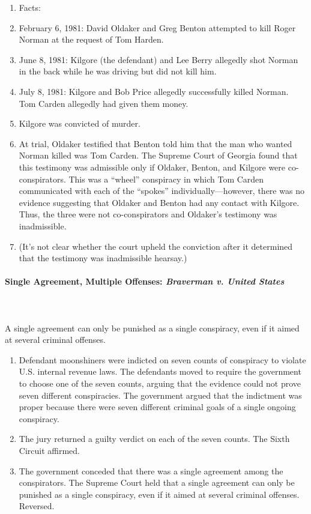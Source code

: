 \begin{enumerate}
    \item Facts:
        \item February 6, 1981: David Oldaker and Greg Benton attempted to 
        kill Roger Norman at the request of Tom Harden.
        \item June 8, 1981: Kilgore (the defendant) and Lee Berry allegedly 
        shot Norman in the back while he was driving but did not kill him.
        \item July 8, 1981: Kilgore and Bob Price allegedly successfully 
        killed Norman. Tom Carden allegedly had given them money.
    \item Kilgore was convicted of murder.
    \item At trial, Oldaker testified that Benton told him that the man who 
    wanted Norman killed was Tom Carden. The Supreme Court of Georgia found 
    that this testimony was admissible only if Oldaker, Benton, and Kilgore 
    were co-conspirators. This was a ``wheel'' conspiracy in which Tom Carden 
    communicated with each of the ``spokes'' individually---however, there was 
    no evidence suggesting that Oldaker and Benton had any contact with 
    Kilgore. Thus, the three were not co-conspirators and Oldaker's testimony 
    was inadmissible.
    \item (It's not clear whether the court upheld the conviction after it 
    determined that the testimony was inadmissible hearsay.)
\end{enumerate}

\paragraph{Single Agreement, Multiple Offenses: \emph{Braverman v. United 
States}}
~\\\\
A single agreement can only be punished as a single conspiracy, even if it 
aimed at several criminal offenses.

\begin{enumerate}
    \item Defendant moonshiners were indicted on seven counts of conspiracy to 
    violate U.S. internal revenue laws. The defendants moved to require the 
    government to choose one of the seven counts, arguing that the evidence 
    could not prove seven different conspiracies. The government argued that 
    the indictment was proper because there were seven different criminal 
    goals of a single ongoing conspiracy.
    \item The jury returned a guilty verdict on each of the seven counts. The 
    Sixth Circuit affirmed.
    \item The government conceded that there was a single agreement among the 
    conspirators. The Supreme Court held that a single agreement can only be 
    punished as a single conspiracy, even if it aimed at several criminal 
    offenses. Reversed.
\end{enumerate}

